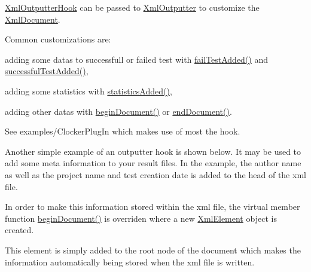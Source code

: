 \hyperlink{class_xml_outputter_hook}{Xml\+Outputter\+Hook} can be passed to \hyperlink{class_xml_outputter}{Xml\+Outputter} to customize the \hyperlink{class_xml_document}{Xml\+Document}.

Common customizations are\+:
\begin{DoxyItemize}
\item adding some datas to successfull or failed test with \hyperlink{class_xml_outputter_hook_a77310985e055cc2c67e91a42c524fbbe}{fail\+Test\+Added()} and \hyperlink{class_xml_outputter_hook_adbcf6ad2cb85d6f1015306fadb7eadcf}{successful\+Test\+Added()},
\item adding some statistics with \hyperlink{class_xml_outputter_hook_a0e602260274d4f005affb4ee84ce4c4a}{statistics\+Added()},
\item adding other datas with \hyperlink{class_xml_outputter_hook_a1d2b5d5d0fc42d273d6430522a70ccbb}{begin\+Document()} or \hyperlink{class_xml_outputter_hook_a300e2a4ef46db4e76428e32f7c7e6a23}{end\+Document()}.
\end{DoxyItemize}

See examples/\+Clocker\+Plug\+In which makes use of most the hook.

Another simple example of an outputter hook is shown below. It may be used to add some meta information to your result files. In the example, the author name as well as the project name and test creation date is added to the head of the xml file.

In order to make this information stored within the xml file, the virtual member function \hyperlink{class_xml_outputter_hook_a1d2b5d5d0fc42d273d6430522a70ccbb}{begin\+Document()} is overriden where a new \hyperlink{class_xml_element}{Xml\+Element} object is created.

This element is simply added to the root node of the document which makes the information automatically being stored when the xml file is written.


